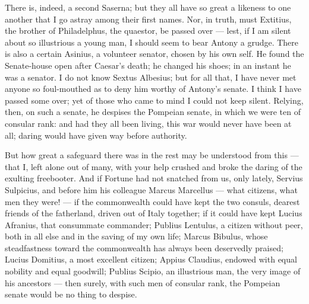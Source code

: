 There is, indeed, a second Saserna; but they all have so great a likeness to one another that I go astray among their first names. Nor, in truth, must Extitius, the brother of Philadelphus, the quaestor, be passed over --- lest, if I am silent about so illustrious a young man, I should seem to bear Antony a grudge. There is also a certain Asinius, a volunteer senator, chosen by his own self. He found the Senate-house open after Caesar's death; he changed his shoes; in an instant he was a senator. I do not know Sextus Albesius; but for all that, I have never met anyone so foul-mouthed as to deny him worthy of Antony's senate. I think I have passed some over; yet of those who came to mind I could not keep silent. Relying, then, on such a senate, he despises the Pompeian senate, in which we were ten of consular rank: and had they all been living, this war would never have been at all; daring would have given way before authority.

 But how great a safeguard there was in the rest may be understood from this --- that I, left alone out of many, with your help crushed and broke the daring of the exulting freebooter. And if Fortune had not snatched from us, only lately, Servius Sulpicius, and before him his colleague Marcus Marcellus --- what citizens, what men they were! --- if the commonwealth could have kept the two consuls, dearest friends of the fatherland, driven out of Italy together; if it could have kept Lucius Afranius, that consummate commander; Publius Lentulus, a citizen without peer, both in all else and in the saving of my own life; Marcus Bibulus, whose steadfastness toward the commonwealth has always been deservedly praised; Lucius Domitius, a most excellent citizen; Appius Claudius, endowed with equal nobility and equal goodwill; Publius Scipio, an illustrious man, the very image of his ancestors --- then surely, with such men of consular rank, the Pompeian senate would be no thing to despise.

